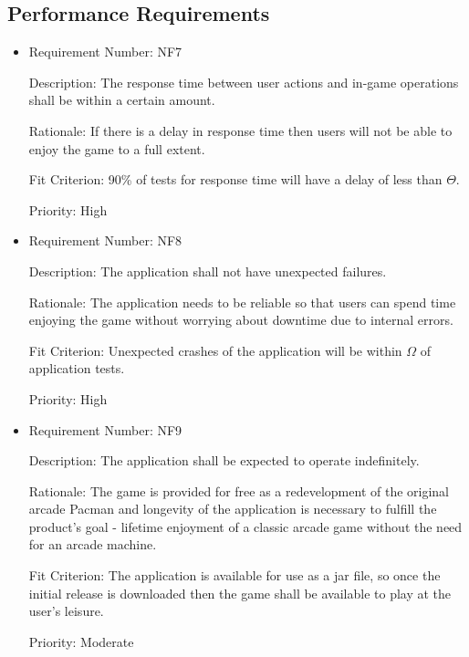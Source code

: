 \documentclass[12pt, titlepage]{article}
\begin{document}
\subsection{Performance Requirements}
\begin{itemize}
	\item
	Requirement Number: \hypertarget{nf7}{NF7}

	Description: The response time between user actions and in-game operations shall be within a certain amount.

	Rationale: If there is a delay in response time then users will not be able to enjoy the game to a full extent.

	Fit Criterion: 90\% of tests for response time will have a delay of less than $\hyperref[tab:constants]{\Theta}$.

	Priority: High

	\item
	Requirement Number: \hypertarget{nf8}{NF8}

	Description: The application shall not have unexpected failures.

	Rationale: The application needs to be reliable so that users can spend time enjoying the game without worrying about downtime due to internal errors.

	Fit Criterion: Unexpected crashes of the application will be within $\hyperref[tab:constants]{\Omega}$ of application tests.

	Priority: High

	\item
	Requirement Number: \hypertarget{nf9}{NF9}

	Description: The application shall be expected to operate indefinitely.

	Rationale: The game is provided for free as a redevelopment of the original arcade Pacman and longevity of the application is necessary to fulfill the product's goal - lifetime enjoyment of a classic arcade game without the need for an arcade machine.

	Fit Criterion: The application is available for use as a jar file, so once the initial release is downloaded then the game shall be available to play at the user's leisure.

	Priority: Moderate

\end{itemize}
\end{document}
